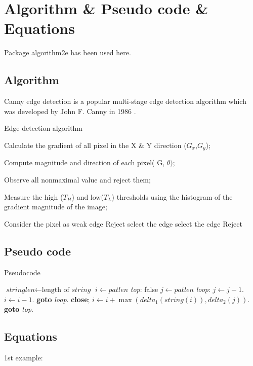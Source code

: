 \section{Algorithm \& Pseudo code \& Equations}
Package algorithm2e has been used here.
\subsection{Algorithm}
Canny edge detection is a popular multi-stage edge detection algorithm which was developed by John F. Canny in 1986 \cite{40}. 
\begin{algorithm}[ht]
\DontPrintSemicolon
\caption{Edge detection algorithm}
\SetAlgoLined
{}
Calculate the gradient of all pixel in the X \& Y direction ($G_x$,$G_y$);

Compute magnitude and direction of each pixel( G, $\theta)$;\

Observe all nonmaximal value and reject them;\

Measure the high ($T_H$) and low($T_L$) thresholds using the histogram of the gradient magnitude of the image;\

{Consider the pixel as weak edge}
\Else
{Reject}
{select the edge}
{select the edge}
\Else
{Reject}
\end{algorithm}
\subsection{Pseudo code}
\begin{algorithm}[ht]
\caption{Pseudocode}\label{euclid}
\begin{algorithmic}[1]
\State $\textit{stringlen} \gets \text{length of }\textit{string}$
\State $i \gets \textit{patlen}$
\BState \emph{top}:
 \Return false
\State $j \gets \textit{patlen}$
\BState \emph{loop}:
\State $j \gets j-1$.
\State $i \gets i-1$.
\State \textbf{goto} \emph{loop}.
\State \textbf{close};
\State $i \gets i+\max(\textit{delta}_1(\textit{string}(i)),\textit{delta}_2(j))$.
\State \textbf{goto} \emph{top}.
\EndProcedure
\end{algorithmic}
\end{algorithm}
\subsection{Equations}
1st example:


